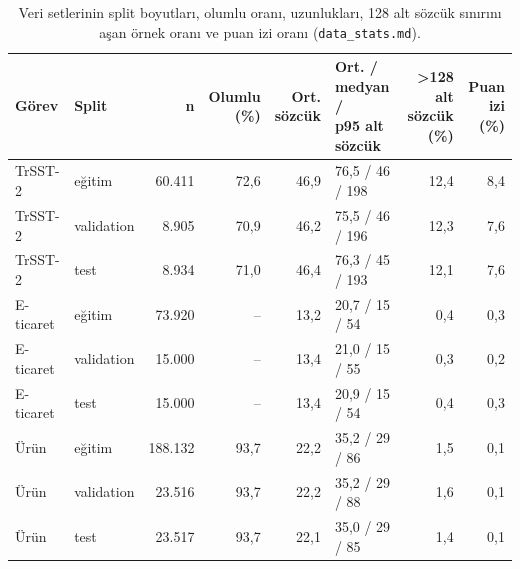 \documentclass[11pt]{article}
\begin{document}
\begin{table}[!htbp]
\centering
\footnotesize
\setlength{\tabcolsep}{3pt}
\begin{tabular}{llrrrlrr}
\toprule
Görev & Split & n & \makecell[r]{Olumlu \\ (\%)} & \makecell[r]{Ort. \\ sözcük} & \makecell[l]{Ort. / medyan / \\ p95 alt sözcük} & \makecell[r]{>128 alt \\ sözcük (\%)} & \makecell[r]{Puan \\ izi (\%)} \\
\midrule
TrSST-2 & eğitim & \mbox{60.411} & \mbox{72,6} & \mbox{46,9} & 76,5 / 46 / 198 & \mbox{12,4} & \mbox{8,4} \\
TrSST-2 & validation & \mbox{8.905} & \mbox{70,9} & \mbox{46,2} & 75,5 / 46 / 196 & \mbox{12,3} & \mbox{7,6} \\
TrSST-2 & test & \mbox{8.934} & \mbox{71,0} & \mbox{46,4} & 76,3 / 45 / 193 & \mbox{12,1} & \mbox{7,6} \\
E-ticaret & eğitim & \mbox{73.920} & \mbox{–} & \mbox{13,2} & 20,7 / 15 / 54 & \mbox{0,4} & \mbox{0,3} \\
E-ticaret & validation & \mbox{15.000} & \mbox{–} & \mbox{13,4} & 21,0 / 15 / 55 & \mbox{0,3} & \mbox{0,2} \\
E-ticaret & test & \mbox{15.000} & \mbox{–} & \mbox{13,4} & 20,9 / 15 / 54 & \mbox{0,4} & \mbox{0,3} \\
Ürün & eğitim & \mbox{188.132} & \mbox{93,7} & \mbox{22,2} & 35,2 / 29 / 86 & \mbox{1,5} & \mbox{0,1} \\
Ürün & validation & \mbox{23.516} & \mbox{93,7} & \mbox{22,2} & 35,2 / 29 / 88 & \mbox{1,6} & \mbox{0,1} \\
Ürün & test & \mbox{23.517} & \mbox{93,7} & \mbox{22,1} & 35,0 / 29 / 85 & \mbox{1,4} & \mbox{0,1} \\
\bottomrule
\end{tabular}
\caption{Veri setlerinin split boyutları, olumlu oranı, uzunlukları, 128 alt sözcük sınırını aşan örnek oranı ve puan izi oranı (\texttt{data\_\allowbreak{}\allowbreak{}stats.\allowbreak{}\allowbreak{}md}).}
\label{tab:1}
\end{table}
\end{document}
